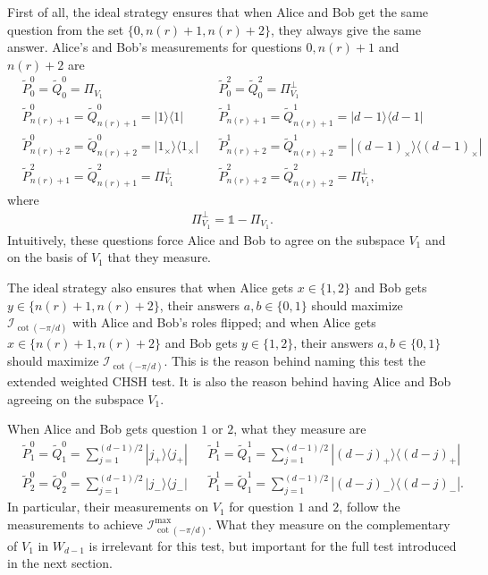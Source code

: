 \documentclass[11pt,letterpaper]{article}
\newcommand{\ket}[1]{|#1\rangle}
\newcommand{\ketbra}[2]{|#1\rangle\langle#2|}
\DeclareMathOperator{\spn}{span}
\newcommand{\1}{\mathbb{1}}
\newcommand{\LS}{LS}
\newcommand{\tP}{\tilde{P}}
\newcommand{\tQ}{\tilde{Q}}
\newcommand{\nr}{n(r)}
\newcommand{\I}{\mathcal{I}}
\theoremstyle{definition}
\begin{document}

First of all, the ideal strategy ensures that when 
Alice and Bob get the same question from the set $\{0,\nr+1,\nr+2\}$, they always give the same answer.
Alice's and Bob's measurements for questions $0, \nr+1$ and $\nr+2$ are
\begin{align*}
	&\tP_0^0 = \tQ_0^0 = \Pi_{V_1} && \tP_0^2 = \tQ_0^2 = \Pi_{V_1}^\perp \\
	&\tP_{\nr+1}^0 = \tQ_{\nr+1}^0 = \ketbra{1}{1} &&
	\tP_{\nr+1}^1 = \tQ_{\nr+1}^1 = \ketbra{d-1}{d-1} \\
	&\tP_{\nr+2}^0 = \tQ_{\nr+2}^0 = \ketbra{1_{\times}}{1_{\times}} && \tP_{\nr+2}^1 = \tQ_{\nr+2}^1 = \ketbra{(d-1)_{\times}}{(d-1)_{\times}} \\
	&\tP_{\nr+1}^2 = \tQ_{\nr+1}^2 = \Pi_{V_1}^\perp &&
	 \tP_{\nr+2}^2 = \tQ_{\nr+2}^2 = \Pi_{V_1}^\perp,
\end{align*}
where
\begin{align*}
    \Pi_{V_1}^{\perp} = \1 - \Pi_{V_1}.
\end{align*}
Intuitively, these questions force Alice and Bob to agree on the subspace $V_1$ and
on the basis of $V_1$ that they measure.

The ideal strategy also ensures that 
when Alice gets $x \in \{1,2\}$ and Bob gets $y \in \{\nr+1, \nr+2\}$, 
their answers $a,b \in \{0,1\}$ should maximize $\I_{\cot(-\pi/d)}$ with Alice and Bob's roles flipped;
and when Alice gets $x \in \{\nr+1,\nr+2\}$ and Bob gets $y \in \{1, 2\}$,
their answers $a,b \in \{0,1\}$ should maximize $\I_{\cot(-\pi/d)}$.
This is the reason behind naming this test the extended weighted CHSH test.
It is also the reason behind having Alice and Bob agreeing on the subspace $V_1$.

When Alice and Bob gets question $1$ or $2$, what they measure are
\begin{align*}
	&\tP_1^0 = \tQ_1^0 =  \sum_{j=1}^{(d-1)/2}\ketbra{j_+}{j_+} && \tP_1^1 = \tQ_1^1 = \sum_{j=1}^{(d-1)/2} \ketbra{(d-j)_+}{(d-j)_+}\\
	&\tP_2^0 = \tQ_2^0 = \sum_{j=1}^{(d-1)/2} \ketbra{j_-}{j_-} && \tP_1^1 = \tQ_1^1 = \sum_{j=1}^{(d-1)/2} \ketbra{(d-j)_-}{(d-j)_-}.
\end{align*}
In particular, their measurements on $V_1$  
for question $1$ and $2$,
follow the measurements to achieve $\I_{\cot(-\pi/d)}^{\max}$.
What they measure on the complementary of $V_1$ 
in $W_{d-1}$
is irrelevant for this test,
but important for the full test introduced 
in the next section.
\end{document}
